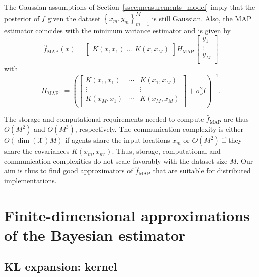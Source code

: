 \documentclass[10pt,twocolumn,twoside]{IEEEtran}					%
\theoremstyle	{plain}
\newcommand{\DefinedAs}			[0]	{\mathrel{\mathop:}=}
\newcommand{\BigOOf}			[1]	{O \left( #1 \right)}
\newcommand	{\Section}				[0]	{Section}
\def\MAP{\textrm{MAP}}
\begin{document}
The Gaussian assumptions of \Section~\ref{ssec:measurements_model} imply that the posterior of $f$ given the dataset $\left\{ x_{m}, y_{m} \right\}_{m = 1}^{M}$ is still Gaussian. Also, the \ac{MAP} estimator coincides with the minimum variance estimator and is given by
%
\begin{equation}
	\widehat{f}_{\MAP}(x)
	=
	\begin{bmatrix}
		K(x, x_{1}) \;
		\ldots \;
		K(x, x_{M})
	\end{bmatrix}
	H_{\MAP}
	\begin{bmatrix}
		y_{1} \\
		\vdots \\
		y_{M} \\
	\end{bmatrix}
	\label{equ:MAP_estimator}
\end{equation}
%
with
%
\begin{equation}
	H_{\MAP}
	\DefinedAs
	\left(
		\begin{bmatrix}
			K(x_{1}, x_{1}) & \cdots & K(x_{1}, x_{M}) \\
			\vdots			&		 & \vdots \\
			K(x_{M}, x_{1}) & \cdots & K(x_{M}, x_{M}) \\
		\end{bmatrix}
		+
		\sigma^{2}_{\nu}
		I
	\right)^{-1} .
	\label{equ:definition_of_H_MAP}
\end{equation}

The storage and computational requirements needed to compute $\widehat{f}_{\MAP}$ are thus $\BigOOf{M^{2}}$ and $\BigOOf{M^{3}}$, respectively. The communication complexity is either $\BigOOf{\dim(\mathcal{X}) M}$ if agents share the input locations $x_{m}$ or $\BigOOf{M^{2}}$ if they share the covariances $K(x_{m}, x_{m'})$. Thus, storage, computational and communication complexities do not scale favorably with the dataset size $M$. Our aim is thus to find good approximators of $\widehat{f}_{\MAP}$ that are suitable for distributed implementations. 



\section{Finite-dimensional approximations of the Bayesian estimator}
\label{sec:KLEstimators}

\subsection{\ac{KL} expansion: kernel}
\label{sec:reformulating_the_measurements_model_using_kl_expansions}
\end{document}

